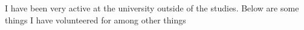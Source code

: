 

\divider



\divider




\newpage

I have been very active at the university outside of the studies. Below are some
things I have volunteered for among other things

\medskip



\divider



\divider




